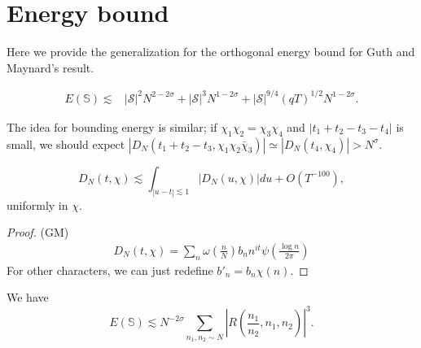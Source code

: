 
\section{Energy bound}
Here we provide the generalization for the orthogonal energy bound for Guth and Maynard's result. 
\begin{proposition}
    \begin{align*}
        E(\mathbb{S})
        \lesssim& |\mathcal{S}|^2N^{2-2\sigma}+ |\mathcal{S}|^3N^{1-2\sigma} + |\mathcal{S}|^{9/4}(qT)^{1/2}N^{{1-2\sigma}}.
    \end{align*}
\end{proposition}
The idea for bounding energy is similar; if $\chi_1\chi_2=\chi_3\chi_4$ and $|t_1+t_2-t_3-t_4|$ is small, we should expect $|D_N(t_1+t_2-t_3,\chi_1\chi_2\bar{\chi}_3)|\simeq |D_N(t_4,\chi_4)|>N^\sigma$.
\begin{lemma}
    \[
    D_N(t,\chi)\lesssim \int_{|u-t|\lesssim 1} |D_N(u,\chi)|du + O(T^{-100}),
    \]
    uniformly in $\chi$.
\end{lemma}
\begin{proof}
    (GM)
    \begin{align*}
        D_N(t,\chi)=\sum_n \omega\left(\frac{n}{N}\right) b_n n^{it} \psi\left(\frac{\log n}{2\pi}\right)
    \end{align*}
    For other characters, we can just redefine $b'_n=b_n\chi(n)$.
\end{proof}
\begin{lemma} We have \[
    E(\mathbb{S})\lesssim N^{-2\sigma}\sum_{n_1,n_2\sim N}\left|R\left(\frac{n_1}{n_2},n_1,n_2\right) \right|^3.
    \]
    
\end{lemma}
